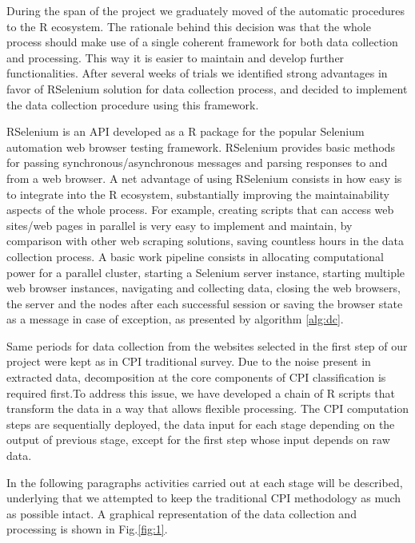 \documentclass[]{article}
\begin{document}
During the span of the project we graduately moved of the automatic procedures to the R ecosystem. The rationale behind this decision was that the whole process should make use of a single coherent framework for both data collection and processing. This way it is easier to maintain and develop further functionalities. After several weeks of trials we identified strong advantages 
in favor of RSelenium solution for data collection process, and decided to implement the data collection procedure using this framework.

RSelenium is an API developed as a R package for the popular Selenium automation web browser testing framework. RSelenium provides basic methods for passing synchronous/asynchronous messages and parsing responses to and from a web browser. A net advantage of using RSelenium consists in how easy is to integrate into the R ecosystem, substantially improving the maintainability aspects of the whole process. For example, creating scripts that can access web sites/web pages in parallel \cite{dopar, foreach} is very easy to implement and maintain, by comparison with other web scraping solutions, saving countless hours in the data collection process. A basic work pipeline consists in allocating computational power for a parallel cluster, starting a Selenium server instance, starting multiple web browser instances, navigating and collecting data, closing the web browsers, the server and the nodes after each successful session or saving the browser state as a message in case of exception, as presented by algorithm \ref{alg:dc}.   



Same periods for data collection from the websites selected in the first step of our project were kept as in CPI traditional survey. 
Due to the noise present in extracted data, 
decomposition at the core components of CPI classification is required first.To address this issue, we have 
developed a chain of R scripts that transform the data in a way that allows flexible processing. The CPI computation steps 
are sequentially deployed, the data input for each stage depending on the output of previous stage, 
except for the first step whose input depends on raw data.

In the following paragraphs activities carried out at each stage will be described, underlying that we attempted to keep the 
traditional CPI methodology as much as possible intact. A graphical representation of the data collection and processing is shown in Fig.\ref{fig:1}.
\end{document}
